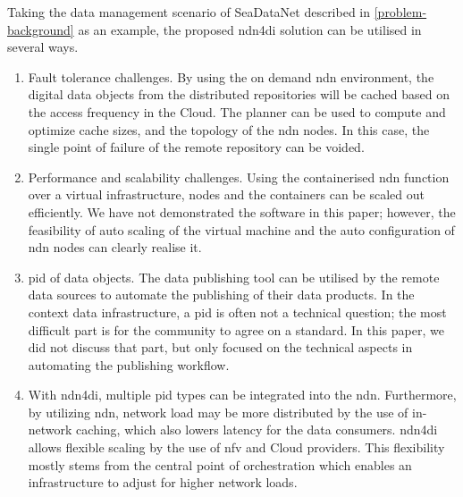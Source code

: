 \documentclass[conference]{IEEEtran}
\begin{document}
Taking the data management scenario of SeaDataNet described in \ref{problem-background} as an example, the proposed \gls{ndn4di} solution can be utilised in several ways. 
\begin{enumerate}
    \item Fault tolerance challenges. By using the on demand \gls{ndn} environment, the digital data objects from the distributed repositories will be cached based on the access frequency in the Cloud. The planner can be used to compute and optimize cache sizes, and the topology of the \gls{ndn} nodes. In this case, the single point of failure of the remote repository can be voided.  
    \item Performance and scalability challenges. Using the containerised \gls{ndn} function over a virtual infrastructure, nodes and the containers can be scaled out efficiently. We have not demonstrated the software in this paper; however, the feasibility of auto scaling of the virtual machine and the auto configuration of \gls{ndn} nodes can clearly realise it.  
    \item \gls{pid} of data objects. The data publishing tool can be utilised by the remote data sources to automate the publishing of their data products. In the context data infrastructure, a \gls{pid} is often not a technical question; the most difficult part is for the community to agree on a standard. In this paper, we did not discuss that part, but only focused on the technical aspects in automating the publishing workflow. 
    \item With \gls{ndn4di}, multiple \gls{pid} types can be integrated into the \gls{ndn}. Furthermore, by utilizing \gls{ndn}, network load may be more distributed by the use of in-network caching, which also lowers latency for the data consumers. \gls{ndn4di} allows flexible scaling by the use of \gls{nfv} and Cloud providers. This flexibility mostly stems from the central point of orchestration which enables an infrastructure to adjust for higher network loads.
\end{enumerate}

\end{document}
